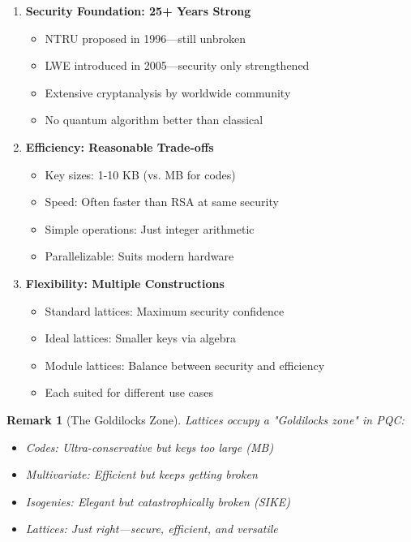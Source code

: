 \documentclass[11pt,a4paper]{article}
\newtheorem{remark}{Remark}
\begin{document}
\begin{enumerate}
    \item \textbf{Security Foundation: 25+ Years Strong}
    \begin{itemize}
        \item NTRU proposed in 1996—still unbroken
        \item LWE introduced in 2005—security only strengthened
        \item Extensive cryptanalysis by worldwide community
        \item No quantum algorithm better than classical
    \end{itemize}
    
    \item \textbf{Efficiency: Reasonable Trade-offs}
    \begin{itemize}
        \item Key sizes: 1-10 KB (vs. MB for codes)
        \item Speed: Often faster than RSA at same security
        \item Simple operations: Just integer arithmetic
        \item Parallelizable: Suits modern hardware
    \end{itemize}
    
    \item \textbf{Flexibility: Multiple Constructions}
    \begin{itemize}
        \item Standard lattices: Maximum security confidence
        \item Ideal lattices: Smaller keys via algebra
        \item Module lattices: Balance between security and efficiency
        \item Each suited for different use cases
    \end{itemize}
\end{enumerate}

\begin{remark}[The Goldilocks Zone]
Lattices occupy a "Goldilocks zone" in PQC:
\begin{itemize}
    \item Codes: Ultra-conservative but keys too large (MB)
    \item Multivariate: Efficient but keeps getting broken
    \item Isogenies: Elegant but catastrophically broken (SIKE)
    \item Lattices: Just right—secure, efficient, and versatile
\end{itemize}
\end{remark}
\end{document}
